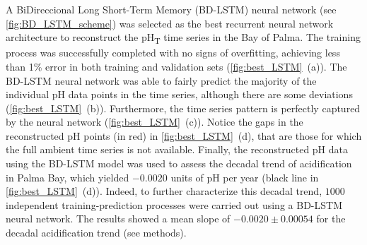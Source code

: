 A BiDireccional Long Short-Term Memory (BD-LSTM) neural network
(see \cref{fig:BD_LSTM_scheme}) was selected as the best recurrent neural
network
architecture to reconstruct the pH\textsubscript{T} time series in the Bay of
Palma. The training process was successfully completed with no signs of
overfitting, achieving less than 1\% error in both training and validation sets
(\cref{fig:best_LSTM}~\textcolor{ref_color}{(a)}). The BD-LSTM neural network
was able to fairly
predict the majority of the individual pH data points in the time series,
although there are some deviations
(\cref{fig:best_LSTM}~\textcolor{ref_color}{(b)}). Furthermore, the
time series pattern is perfectly captured by the neural network
(\cref{fig:best_LSTM}~\textcolor{ref_color}{(c)}). Notice the gaps in the
reconstructed pH points (in
red) in \cref{fig:best_LSTM}~\textcolor{ref_color}{(d)}, that are those for
which the full ambient
time series is not available. Finally, the reconstructed pH data using the
BD-LSTM model was used to assess the decadal trend of acidification in Palma
Bay, which yielded $-0.0020$ units of pH per year (black line in
\cref{fig:best_LSTM}~\textcolor{ref_color}{(d)}). Indeed, to further
characterize this decadal trend,
$1000$ independent training-prediction processes were carried out using a
BD-LSTM neural network. The results showed a mean slope of  $-0.0020 \pm
    0.00054$ for the decadal acidification trend (see methods).

